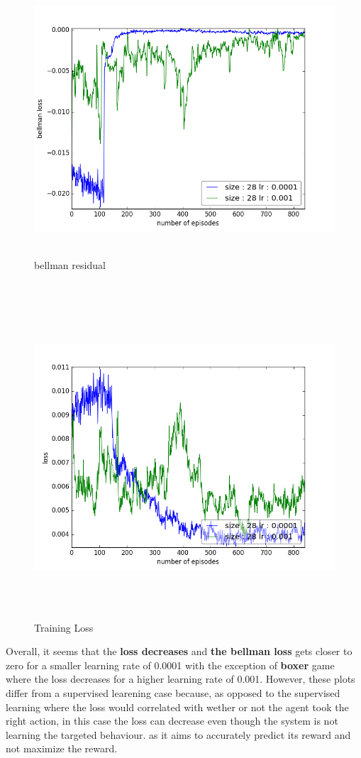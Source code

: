 \documentclass{report}
\begin{document}
\begin{figure}[H]
    \begin{minipage}[c]{.49\linewidth}
        \centering
        \includegraphics[width = \linewidth]{plots/b3/Pong-v3/bellmanLossArray.png}
        \caption{bellman residual}
    \end{minipage}
    \hfill%
    \begin{minipage}[c]{.49\linewidth}
        \centering
        \includegraphics[width = \linewidth]{plots/b3/Pong-v3/lossArray.png}
        \caption{Training Loss}
    \end{minipage}
\end{figure}


Overall, it seems that the \textbf{loss decreases} and \textbf{the bellman loss} gets closer to zero for a smaller learning rate of 0.0001 with the exception of \textbf{boxer} game where the loss decreases for a higher learning rate of 0.001. However, these plots differ from a supervised learening case because, as opposed to the supervised learning where the loss would correlated with wether or not the agent took the right action, in this case the loss can decrease even though the system is not learning the targeted behaviour. as it aims to accurately predict its reward and not maximize the reward.
\end{document}
